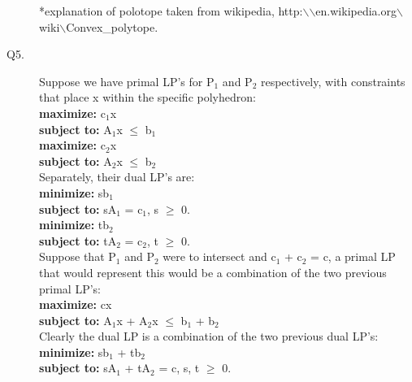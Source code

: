 \documentclass[10pt]{csc_assignment}
\begin{document}
\begin{description}
\tiny{*explanation of polotope taken from wikipedia, http:$\backslash$$\backslash$en.wikipedia.org$\backslash$wiki$\backslash$Convex\_polytope.}\\
\normalsize{}

\newpage
\item[Q5.]
Suppose we have primal LP's for P$_{1}$ and P$_{2}$ respectively, with constraints that place x within the specific polyhedron:\\
\textbf{maximize:} c$_{1}$x\\
\textbf{subject to:} 
A$_{1}$x $\leqslant$ b$_{1}$\\

\textbf{maximize:} c$_{2}$x\\
\textbf{subject to:} 
A$_{2}$x $\leqslant$ b$_{2}$\\

Separately, their dual LP's are:\\
\textbf{minimize:} sb$_{1}$\\
\textbf{subject to:} 
sA$_{1}$ = c$_{1}$,
s $\geqslant$ 0.\\

\textbf{minimize:} tb$_{2}$\\
\textbf{subject to:} 
tA$_{2}$ = c$_{2}$,
t $\geqslant$ 0.\\

Suppose that P$_{1}$ and P$_{2}$ were to intersect and c$_{1}$ +  c$_{2}$ = c, a primal LP that would represent this would be a combination of the two previous primal LP's:\\
\textbf{maximize:} cx\\
\textbf{subject to:} 
A$_{1}$x + A$_{2}$x $\leqslant$ b$_{1}$ + b$_{2}$\\

Clearly the dual LP is a  combination of the two previous dual LP's:\\
\textbf{minimize:} sb$_{1}$ + tb$_{2}$\\
\textbf{subject to:} 
sA$_{1}$ + tA$_{2}$ = c,
s, t $\geqslant$ 0.\\


\end{description}
\end{document}
